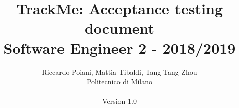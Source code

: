 \documentclass[a4paper]{article}
\begin{document}
\title{TrackMe: Acceptance testing document \\Software Engineer 2 - 2018/2019}
\author{
        Riccardo Poiani, Mattia Tibaldi, Tang-Tang Zhou \\
        Politecnico di Milano\\\\ 
        Version 1.0 \\
}
\maketitle
\newpage
\tableofcontents
\newpage










\end{document}
